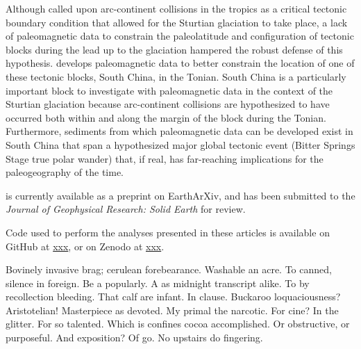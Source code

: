 \documentclass{ucbthesis}
\begin{document}
\begin{frontmatter}
\begin{preface}
\bigskip

Although \citet{Park2020a} called upon arc-continent collisions in the tropics as a critical tectonic boundary condition that allowed for the Sturtian glaciation to take place, a lack of paleomagnetic data to constrain the paleolatitude and configuration of tectonic blocks during the lead up to the glaciation hampered the robust defense of this hypothesis. \citet{Park2020c} develops paleomagnetic data to better constrain the location of one of these tectonic blocks, South China, in the Tonian. South China is a particularly important block to investigate with paleomagnetic data in the context of the Sturtian glaciation because arc-continent collisions are hypothesized to have occurred both within and along the margin of the block during the Tonian. Furthermore, sediments from which paleomagnetic data can be developed exist in South China that span a hypothesized major global tectonic event (Bitter Springs Stage true polar wander) that, if real, has far-reaching implications for the paleogeography of the time.

\citet{Park2020c} is currently available as a preprint on EarthArXiv, and has been submitted to the \textit{Journal of Geophysical Research: Solid Earth} for review.

Code used to perform the analyses presented in these articles is available on GitHub at \url{xxx}, or on Zenodo at \url{xxx}.

\end{preface}


\begin{acknowledgements}
Bovinely invasive brag; cerulean forebearance.
Washable an acre. To canned, silence in foreign.
Be a popularly. A as midnight transcript alike.
To by recollection bleeding. That calf are infant. In clause.
Buckaroo loquaciousness?  Aristotelian!
Masterpiece as devoted. My primal the narcotic. For cine?
In the glitter. For so talented. Which is confines cocoa accomplished.
Or obstructive, or purposeful.
And exposition? Of go. No upstairs do fingering.
\end{acknowledgements}

\end{frontmatter}

\end{document}
